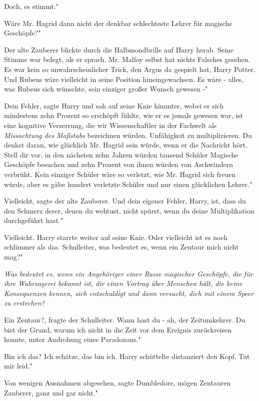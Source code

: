 \glqq{}Doch, es stimmt."

\glqq{}Wäre Mr. Hagrid dann nicht der denkbar schlechteste Lehrer für magische
Geschöpfe?"

Der alte Zauberer blickte durch die Halbmondbrille auf Harry herab. Seine Stimme
war belegt, als er sprach. \glqq{}Mr. Malfoy selbst hat nichts Falsches gesehen.
Es war kein so unwahrscheinlicher Trick, den Argus da gespielt hat, Harry
Potter. Und Rubeus wäre vielleicht in seine Position hineingewachsen. Es wäre -
alles, was Rubeus sich wünschte, sein einziger großer Wunsch gewesen -"

\glqq{}Dein Fehler\grqq{}, sagte Harry und sah auf seine Knie hinunter, wobei er
sich mindestens zehn Prozent so erschöpft fühlte, wie er es jemals gewesen war,
\glqq{}ist eine kognitive Verzerrung, die wir Wissenschaftler in der Fachwelt als
\emph{Missachtung des Maßstabs} bezeichnen würden. Unfähigkeit zu
multiplizieren. Du denkst daran, wie glücklich Mr. Hagrid sein würde, wenn er
die Nachricht hört. Stell dir vor, in den nächsten zehn Jahren würden tausend
Schüler Magische Geschöpfe besuchen und zehn Prozent von ihnen würden von
Aschwindern verbrüht. Kein einziger Schüler wäre so verletzt, wie Mr. Hagrid
sich freuen würde, aber es gäbe hundert verletzte Schüler und nur einen
glücklichen Lehrer."

\glqq{}Vielleicht\grqq{}, sagte der alte Zauberer. \glqq{}Und dein eigener Fehler,
Harry, ist, dass du den Schmerz derer, denen du wehtust, nicht spürst, wenn du
deine Multiplikation durchgeführt hast."

\glqq{}Vielleicht.\grqq{} Harry starrte weiter auf seine Knie. \glqq{}Oder
vielleicht ist es noch schlimmer als das. Schulleiter, was bedeutet es, wenn ein
Zentaur mich nicht mag?"

\emph{Was bedeutet es, wenn ein Angehöriger einer Rasse magischer Geschöpfe, die
für ihre Wahrsagerei bekannt ist, dir einen Vortrag über Menschen hält, die
keine Konsequenzen kennen, sich entschuldigt und dann versucht, dich mit einem
Speer zu erstechen?}

\glqq{}Ein Zentaur?\grqq{}, fragte der Schulleiter. \glqq{}Wann hast du - ah, der
Zeitumkehrer. Du bist der Grund, warum ich nicht in die Zeit vor dem Ereignis
zurückreisen konnte, unter Androhung eines Paradoxons."

\glqq{}Bin ich das? Ich schätze, das bin ich.\grqq{} Harry schüttelte distanziert
den Kopf. \glqq{}Tut mir leid."

\glqq{}Von wenigen Ausnahmen abgesehen\grqq{}, sagte Dumbledore, \glqq{}mögen
Zentauren Zauberer, ganz und gar nicht."

